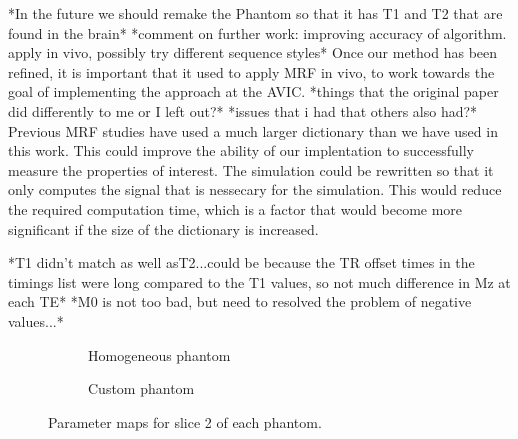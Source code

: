 \documentclass[journal]{IEEEtran}
\newlength\figureheight
\newlength\figurewidth
\begin{document}
*In the future we should remake the Phantom so that it has T1 and T2 that are found in the brain*
*comment on further work: improving accuracy of algorithm. apply in vivo, possibly try different sequence styles*
Once our method has been refined, it is important that it used to apply MRF in vivo, to work towards the goal of implementing the approach at the AVIC. 
*things that the original paper did differently to me or I left out?*
*issues that i had that others also had?*
Previous MRF studies have used a much larger dictionary than we have used in this work. This could improve the ability of our implentation to successfully measure the properties of interest.
The simulation could be rewritten so that it only computes the signal that is nessecary for the simulation. This would reduce the required computation time, which is a factor that would become more significant if the size of the dictionary is increased.



*T1 didn't match as well asT2...could be because the TR offset times in the timings list were long compared to the T1 values, so not much difference in Mz at each TE*
*M0 is not too bad, but need to resolved the problem of negative values...*



\begin{figure*}

\begin{minipage}[c]{1\textwidth}

\begin{subfigure}[b]{0.5\textwidth}
\centering
\setlength{}
\setlength{}







    \caption{Homogeneous phantom}
    \label{fig:sphereD170list3}

\end{subfigure}
\begin{subfigure}[b]{0.5\textwidth}
\centering
\setlength{}
\setlength{}







    \caption{Custom phantom}
    \label{fig:Jacklist3}
\end{subfigure}
\caption{Parameter maps for slice 2 of each phantom.}
\end{minipage}
\end{figure*}
\end{document}
